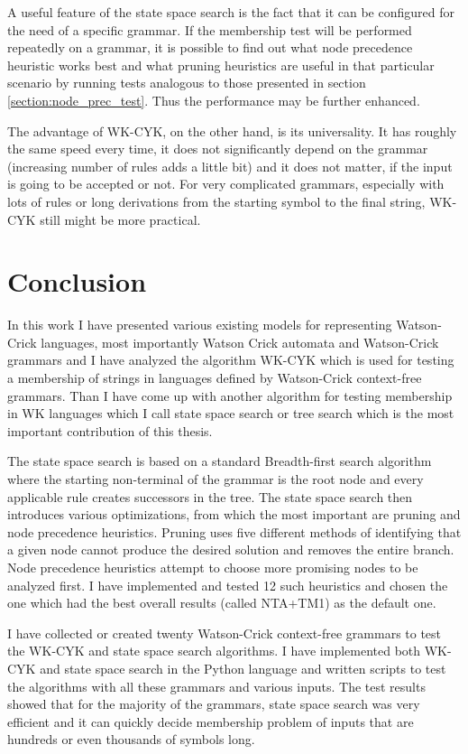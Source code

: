 A useful feature of the state space search is the fact that it can be configured for the need of a specific grammar. If the membership test will be performed repeatedly on a grammar, it is possible to find out what node precedence heuristic works best and what pruning heuristics are useful in that particular scenario by running tests analogous to those presented in section \ref{section:node_prec_test}. Thus the performance may be further enhanced.

The advantage of WK-CYK, on the other hand, is its universality. It has roughly the same speed every time, it does not significantly depend on the grammar (increasing number of rules adds a little bit) and it does not matter, if the input is going to be accepted or not. For very complicated grammars, especially with lots of rules or long derivations from the starting symbol to the final string, WK-CYK still might be more practical.

\chapter{Conclusion}
In this work I have presented various existing models for representing Watson-Crick languages, most importantly Watson Crick automata and Watson-Crick grammars and I have analyzed the algorithm WK-CYK which is used for testing a membership of strings in languages defined by Watson-Crick context-free grammars. Than I have come up with another algorithm for testing membership in WK languages which I call state space search or tree search which is the most important contribution of this thesis.

The state space search is based on a standard Breadth-first search algorithm where the starting non-terminal of the grammar is the root node and every applicable rule creates successors in the tree. The state space search then introduces various optimizations, from which the most important are pruning and node precedence heuristics. Pruning uses five different methods of identifying that a given node cannot produce the desired solution and removes the entire branch. Node precedence heuristics attempt to choose more promising nodes to be analyzed first. I have implemented and tested 12 such heuristics and chosen the one which had the best overall results (called NTA+TM1) as the default one.

I have collected or created twenty Watson-Crick context-free grammars to test the WK-CYK and state space search algorithms.
I have implemented both WK-CYK and state space search in the Python language and written scripts to test the algorithms with all these grammars and various inputs. The test results showed that for the majority of the grammars, state space search was very efficient and it can quickly decide membership problem of inputs that are hundreds or even thousands of symbols long.


